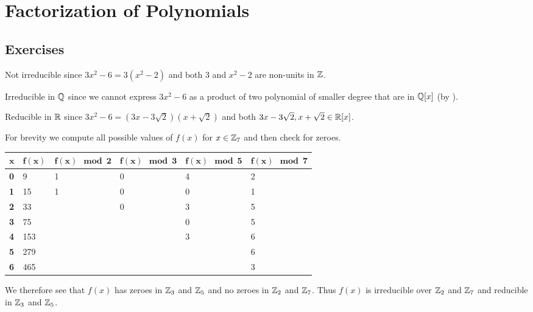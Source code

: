 \section{Factorization of Polynomials}
\subsection*{Exercises}
\begin{questions}
    \item \begin{partquestions}{\alph*}
        \item Not irreducible since $3x^2 - 6 = 3(x^2-2)$ and both 3 and $x^2-2$ are non-units in $\mathbb{Z}$.
        \item Irreducible in $\mathbb{Q}$ since we cannot express $3x^2-6$ as a product of two polynomial of smaller degree that are in $\mathbb{Q}[x]$ (by ).
        \item Reducible in $\mathbb{R}$ since $3x^2 - 6 = (3x-3\sqrt2)(x+\sqrt2)$ and both $3x-3\sqrt2, x+\sqrt2 \in \mathbb{R}[x]$.
    \end{partquestions}

    \item For brevity we compute all possible values of $f(x)$ for $x \in \mathbb{Z}_7$ and then check for zeroes.
    \begin{table}[H]
        \centering
        \begin{tabular}{|l|l|l|l|l|l|}
            \hline
            $\boldsymbol{x}$ & $\boldsymbol{f(x)}$ & $\boldsymbol{f(x) \mod2}$ & $\boldsymbol{f(x) \mod3}$ & $\boldsymbol{f(x) \mod5}$ & $\boldsymbol{f(x) \mod7}$ \\ \hline
            \textbf{0} & 9 & 1 & 0 & 4 & 2 \\ \hline
            \textbf{1} & 15 & 1 & 0 & 0 & 1 \\ \hline
            \textbf{2} & 33 &  & 0 & 3 & 5 \\ \hline
            \textbf{3} & 75 &  &  & 0 & 5 \\ \hline
            \textbf{4} & 153 &  &  & 3 & 6 \\ \hline
            \textbf{5} & 279 &  &  &  & 6 \\ \hline
            \textbf{6} & 465 &  &  &  & 3 \\ \hline
        \end{tabular}
    \end{table}
    We therefore see that $f(x)$ has zeroes in $\mathbb{Z}_3$ and $\mathbb{Z}_5$ and no zeroes in $\mathbb{Z}_2$ and $\mathbb{Z}_7$. Thus $f(x)$ is irreducible over $\mathbb{Z}_2$ and $\mathbb{Z}_7$ and reducible in $\mathbb{Z}_3$ and $\mathbb{Z}_5$.


\end{questions}
